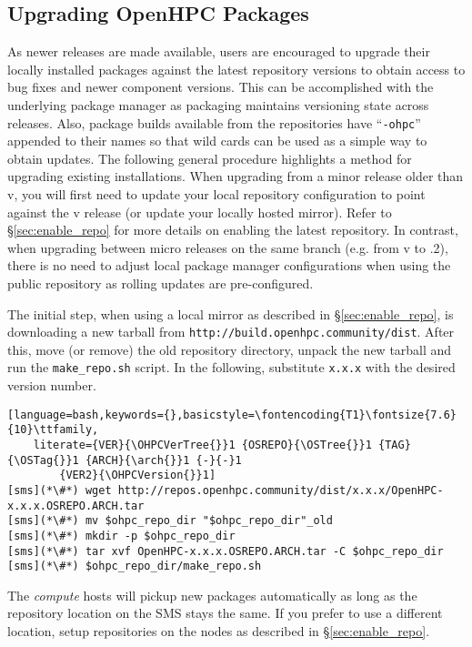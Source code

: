 \subsection{Upgrading OpenHPC Packages}  \label{appendix:upgrade}


As newer \OHPC{} releases are made available, users are encouraged to upgrade
their locally installed packages against the latest repository versions to
obtain access to bug fixes and newer component versions. This can be
accomplished with the underlying package manager as \OHPC{} packaging maintains
versioning state across releases. Also, package builds available from the
\OHPC{} repositories have ``\texttt{-ohpc}'' appended to their names so that
wild cards can be used as a simple way to obtain updates. The following general
procedure highlights a method for upgrading existing installations.
When upgrading from a minor release older than v\OHPCVerTree{}, you will first
need to update your local \OHPC{} repository configuration to point against the
v\OHPCVerTree{} release (or update your locally hosted mirror). Refer to
\S\ref{sec:enable_repo} for more details on enabling the latest
repository. In contrast, when upgrading between micro releases on the same
branch (e.g. from v\OHPCVerTree{} to \OHPCVerTree{}.2), there is no need to
adjust local package manager configurations when using the public repository as
rolling updates are pre-configured.
 
The initial step, when using a local mirror as described in
\S\ref{sec:enable_repo}, is downloading a new tarball from \texttt{http://build.openhpc.community/dist}. 
After this, move (or remove) the old repository directory, unpack
the new tarball and run the \texttt{make\_repo.sh} script. In the following,
substitute \texttt{x.x.x} with the desired version number. 

\begin{lstlisting}[language=bash,keywords={},basicstyle=\fontencoding{T1}\fontsize{7.6}{10}\ttfamily,
	literate={VER}{\OHPCVerTree{}}1 {OSREPO}{\OSTree{}}1 {TAG}{\OSTag{}}1 {ARCH}{\arch{}}1 {-}{-}1 
        {VER2}{\OHPCVersion{}}1]
[sms](*\#*) wget http://repos.openhpc.community/dist/x.x.x/OpenHPC-x.x.x.OSREPO.ARCH.tar
[sms](*\#*) mv $ohpc_repo_dir "$ohpc_repo_dir"_old
[sms](*\#*) mkdir -p $ohpc_repo_dir
[sms](*\#*) tar xvf OpenHPC-x.x.x.OSREPO.ARCH.tar -C $ohpc_repo_dir
[sms](*\#*) $ohpc_repo_dir/make_repo.sh
\end{lstlisting}

The {\em compute} hosts will pickup new packages automatically as long as the
repository location on the SMS stays the same. If you prefer to use a different
location, setup repositories on the nodes as described in
\S\ref{sec:enable_repo}.

